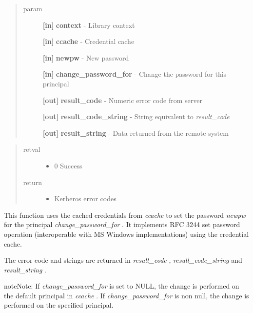 \documentclass[letterpaper,10pt,english]{sphinxmanual}
\begin{document}
\begin{quote}\begin{description}
\item[{param}] \leavevmode
\textbf{{[}in{]}} \textbf{context} - Library context

\textbf{{[}in{]}} \textbf{ccache} - Credential cache

\textbf{{[}in{]}} \textbf{newpw} - New password

\textbf{{[}in{]}} \textbf{change\_password\_for} - Change the password for this principal

\textbf{{[}out{]}} \textbf{result\_code} - Numeric error code from server

\textbf{{[}out{]}} \textbf{result\_code\_string} - String equivalent to \emph{result\_code}

\textbf{{[}out{]}} \textbf{result\_string} - Data returned from the remote system

\end{description}\end{quote}
\begin{quote}\begin{description}
\item[{retval}] \leavevmode\begin{itemize}
\item {} 
0   Success

\end{itemize}

\item[{return}] \leavevmode\begin{itemize}
\item {} 
Kerberos error codes

\end{itemize}

\end{description}\end{quote}

This function uses the cached credentials from \emph{ccache} to set the password \emph{newpw} for the principal \emph{change\_password\_for} . It implements RFC 3244 set password operation (interoperable with MS Windows implementations) using the credential cache.

The error code and strings are returned in \emph{result\_code} , \emph{result\_code\_string} and \emph{result\_string} .

\begin{notice}{note}{Note:}
If \emph{change\_password\_for} is set to NULL, the change is performed on the default principal in \emph{ccache} . If \emph{change\_password\_for} is non null, the change is performed on the specified principal.
\end{notice}
\end{document}
